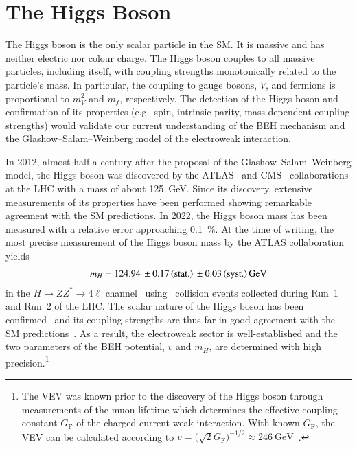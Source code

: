 \section{The Higgs Boson}%
\label{sec:higgs_boson}

The Higgs boson is the only scalar particle in the SM. It is massive and has
neither electric nor colour charge. The Higgs boson couples to all massive
particles, including itself, with coupling strengths monotonically related to
the particle's mass. In particular, the coupling to gauge bosons, $V$, and
fermions is proportional to $m_V^2$ and $m_f$, respectively.
The detection of the Higgs boson and confirmation of its
properties (e.g.\ spin, intrinsic parity, mass-dependent coupling strengths)
would validate our current understanding of the BEH mechanism and the
Glashow--Salam--Weinberg model of the electroweak interaction.

In 2012, almost half a century after the proposal of the
Glashow--Salam--Weinberg model, the Higgs boson was discovered by the
ATLAS~\cite{HIGG-2012-27} and CMS~\cite{CMS-HIG-12-028} collaborations at the
LHC with a mass of about \SI{125}{\GeV}. Since its discovery, extensive
measurements of its properties have been performed showing remarkable agreement
with the SM predictions. In 2022, the Higgs boson mass has been measured with a
relative error approaching \SI{0.1}{\percent}. At the time of writing, the most
precise measurement of the Higgs boson mass by the ATLAS collaboration yields
\begin{align*}
  m_{H} = \num{124.94}%
  \valuesep\numerrt{0.17}{stat.}%
  \valuesep\numerrt{0.03}{syst.}%
  \valuesep\si{\GeV}
\end{align*}
in the $H \to Z Z^{*} \to 4\ell$ channel~\cite{HIGG-2020-07} using \pp~collision
events collected during Run~1 and Run~2 of the LHC. The scalar nature of the
Higgs boson has been confirmed~\cite{HIGG-2013-17-witherratum,CMS-HIG-14-018}
and its coupling strengths are thus far in good agreement with the SM
predictions~\cite{HIGG-2021-23,CMS-HIG-22-001}. As a result, the electroweak
sector is well-established and the two parameters of the BEH potential, $v$ and
$m_{H}$, are determined with high precision.\footnote{The VEV was known prior to
  the discovery of the Higgs boson through measurements of the muon lifetime
  which determines the effective coupling constant $G_{\text{F}}$ of the
  charged-current weak interaction. With known $G_{\text{F}}$, the VEV can be
  calculated according to
  $v = \bigl( \sqrt{2} G_{\text{F}} \bigr)^{-1/2} \approx
  \SI{246}{\GeV}$~\cite{MuLan:2010shf}.}


